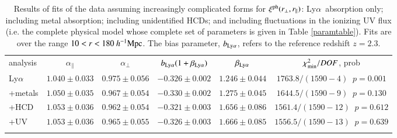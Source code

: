 \documentclass{aa}
\newcommand{\xicosmo}{\xi^{\rm ph}}
\newcommand{\apar}{\alpha_\parallel}
\newcommand{\aperp}{\alpha_\perp}
\newcommand{\hMpc}{h^{-1}{\rm Mpc}}
\newcommand{\Lya}{Ly$\alpha$~}
\newcommand{\rperp}{r_\perp}
\newcommand{\rpar}{r_\parallel}
\newcommand{\betalya}{\beta_{\rm Ly\alpha}}
\newcommand{\blya}{b_{\rm Ly\alpha}}
\begin{document}
\begin{table*}[t]
\centering
\caption{
Results of fits of the data assuming
increasingly complicated forms for $\xicosmo(\rperp,\rpar)$: \Lya absorption only;
including  metal absorption;
including unidentified HCDs; 
and including fluctuations in the ionizing UV flux
(i.e. the complete physical model whose complete set of
parameters is given in Table \ref{paramtable}).
Fits are over the range $10<r<180~\hMpc$.
The bias parameter, $\blya$, refers to  the reference redshift $z=2.3$.
}
\begin{tabular}{l c c c c c}
analysis  
    & $\apar$ 
    & $\aperp$  
    & $\blya(1+\betalya)$
    & $\betalya$
    & $\chi^2_{\rm min}/DOF$, prob  \\
\noalign{\smallskip} 
\hline
\noalign{\smallskip}
\Lya  & $ 1.040  \pm 0.033  $ & $ 0.975  \pm 0.056  $ & $ -0.326  \pm 0.002  $ & $ 1.246  \pm 0.044  $ & $ 1763.8  /(  1590 - 4 )\;\;p=0.001  $  \\ %
+metals  & $ 1.050  \pm 0.035  $ & $ 0.967  \pm 0.054  $ & $ -0.330  \pm 0.002  $ & $ 1.275  \pm 0.045  $ & $ 1644.5  /(  1590 - 9 )\;\;p=0.130  $  \\ %
+HCD  & $ 1.053  \pm 0.036  $ & $ 0.962  \pm 0.054  $ & $ -0.321  \pm 0.003  $ & $ 1.656  \pm 0.086  $ & $ 1561.4  /(  1590 - 12 )\;\;p=0.612  $  \\ %
+UV  & $ 1.053  \pm 0.036  $ & $ 0.965  \pm 0.055  $ & $ -0.326  \pm 0.003  $ & $ 1.666  \pm 0.085  $ & $ 1556.5  /(  1590 - 13 )\;\;p=0.639  $  \\ %
\label{fitautotable}
\end{tabular}
\end{table*}%
\end{document}
